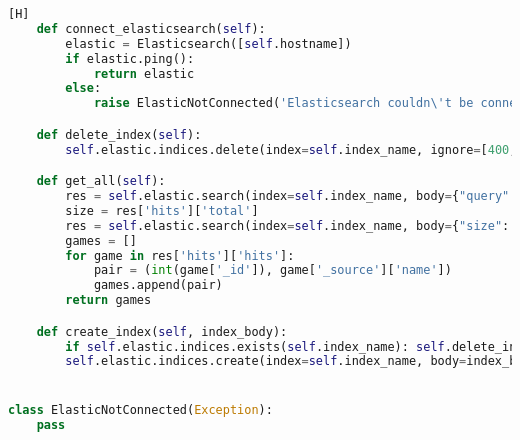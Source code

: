 \begin{anexosenv}
\begin{lstlisting}[language={Python}, caption = {Código do \textit{\textbf{Elasticsearch}}}] [H]
	def connect_elasticsearch(self):
		elastic = Elasticsearch([self.hostname])
		if elastic.ping():
			return elastic
		else:
			raise ElasticNotConnected('Elasticsearch couldn\'t be connected!!!')

	def delete_index(self):
		self.elastic.indices.delete(index=self.index_name, ignore=[400, 404])

	def get_all(self):
		res = self.elastic.search(index=self.index_name, body={"query": {"match_all":{}}})
		size = res['hits']['total']
		res = self.elastic.search(index=self.index_name, body={"size": size, "query": {"match_all":{}}})
		games = []
		for game in res['hits']['hits']:
			pair = (int(game['_id']), game['_source']['name'])
			games.append(pair)
		return games

	def create_index(self, index_body):
		if self.elastic.indices.exists(self.index_name): self.delete_index()
		self.elastic.indices.create(index=self.index_name, body=index_body, ignore=400)


class ElasticNotConnected(Exception):
	pass
\end{lstlisting}

\end{anexosenv}

